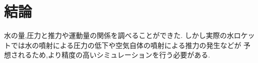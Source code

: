 \section{結論}
水の量,圧力と推力や運動量の関係を調べることができた.
しかし実際の水ロケットでは水の噴射による圧力の低下や空気自体の噴射による推力の発生などが
予想されるため,より精度の高いシミュレーションを行う必要がある.